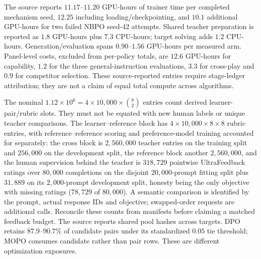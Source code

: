 \documentclass{article}
\theoremstyle{remark}
\theoremstyle{plain}
\begin{document}
The source reports $11.17$--$11.20$ GPU-hours of trainer time per completed mechanism seed, $12.25$ including loading/checkpointing, and $10.1$ additional GPU-hours for two failed NBPO seed-42 attempts. Shared teacher preparation is reported as $1.8$ GPU-hours plus $7.3$ CPU-hours; target solving adds $1.2$ CPU-hours. Generation/evaluation spans $0.90$--$1.56$ GPU-hours per measured arm. Panel-level costs, excluded from per-policy totals, are $12.6$ GPU-hours for capability, $1.2$ for the three general-instruction evaluations, $3.3$ for cross-play and $0.9$ for competitor selection. These source-reported entries require stage-ledger attribution; they are not a claim of equal total compute across algorithms.

The nominal $1.12\times10^6=4\times10{,}000\times\binom82$ entries count derived learner-pair/rubric slots. They must not be equated with new human labels or unique teacher comparisons. The learner--reference block has $4\times10{,}000\times8\times8$ rubric entries, with reference--reference scoring and preference-model training accounted for separately: the cross block is $2{,}560{,}000$ teacher entries on the training split and $256{,}000$ on the development split, the reference block another $2{,}560{,}000$, and the human supervision behind the teacher is $318{,}729$ pointwise UltraFeedback ratings over $80{,}000$ completions on the disjoint $20{,}000$-prompt fitting split plus $31{,}889$ on its $2{,}000$-prompt development split, honesty being the only objective with missing ratings ($78{,}729$ of $80{,}000$). A semantic comparison is identified by the prompt, actual response IDs and objective; swapped-order requests are additional calls. Reconcile these counts from manifests before claiming a matched feedback budget. The source reports shared pool hashes across targets. DPO retains $87.9$--$90.7\%$ of candidate pairs under its standardized $0.05$ tie threshold; MOPO consumes candidate rather than pair rows. These are different optimization exposures.
\end{document}
